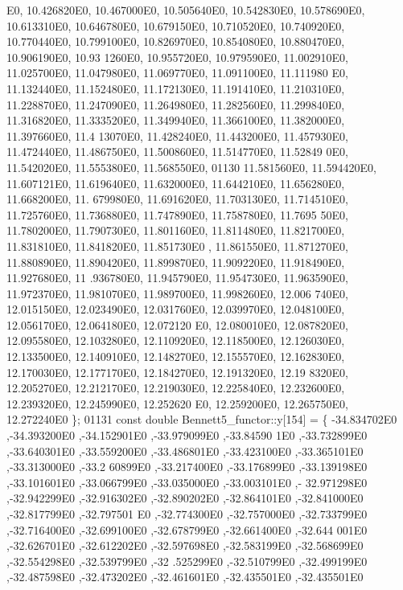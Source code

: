 \begin{DoxyCode}
      E0, 10.426820E0, 10.467000E0, 10.505640E0, 10.542830E0, 10.578690E0, 10.613310E0, 10.646780E0, 10.679150E0, 
      10.710520E0, 10.740920E0, 10.770440E0, 10.799100E0, 10.826970E0, 10.854080E0, 10.880470E0, 10.906190E0, 10.93
      1260E0, 10.955720E0, 10.979590E0, 11.002910E0, 11.025700E0, 11.047980E0, 11.069770E0, 11.091100E0, 11.111980
      E0, 11.132440E0, 11.152480E0, 11.172130E0, 11.191410E0, 11.210310E0, 11.228870E0, 11.247090E0, 11.264980E0, 
      11.282560E0, 11.299840E0, 11.316820E0, 11.333520E0, 11.349940E0, 11.366100E0, 11.382000E0, 11.397660E0, 11.4
      13070E0, 11.428240E0, 11.443200E0, 11.457930E0, 11.472440E0, 11.486750E0, 11.500860E0, 11.514770E0, 11.52849
      0E0, 11.542020E0, 11.555380E0, 11.568550E0,
01130 11.581560E0, 11.594420E0, 11.607121E0, 11.619640E0, 11.632000E0, 11.644210E0, 11.656280E0, 11.668200E0, 11.
      679980E0, 11.691620E0, 11.703130E0, 11.714510E0, 11.725760E0, 11.736880E0, 11.747890E0, 11.758780E0, 11.7695
      50E0, 11.780200E0, 11.790730E0, 11.801160E0, 11.811480E0, 11.821700E0, 11.831810E0, 11.841820E0, 11.851730E0
      , 11.861550E0, 11.871270E0, 11.880890E0, 11.890420E0, 11.899870E0, 11.909220E0, 11.918490E0, 11.927680E0, 11
      .936780E0, 11.945790E0, 11.954730E0, 11.963590E0, 11.972370E0, 11.981070E0, 11.989700E0, 11.998260E0, 12.006
      740E0, 12.015150E0, 12.023490E0, 12.031760E0, 12.039970E0, 12.048100E0, 12.056170E0, 12.064180E0, 12.072120
      E0, 12.080010E0, 12.087820E0, 12.095580E0, 12.103280E0, 12.110920E0, 12.118500E0, 12.126030E0, 12.133500E0, 
      12.140910E0, 12.148270E0, 12.155570E0, 12.162830E0, 12.170030E0, 12.177170E0, 12.184270E0, 12.191320E0, 12.19
      8320E0, 12.205270E0, 12.212170E0, 12.219030E0, 12.225840E0, 12.232600E0, 12.239320E0, 12.245990E0, 12.252620
      E0, 12.259200E0, 12.265750E0, 12.272240E0 \};
01131 \textcolor{keyword}{const} \textcolor{keywordtype}{double} Bennett5\_functor::y[154] = \{ -34.834702E0 ,-34.393200E0 ,-34.152901E0 ,-33.979099E0 ,-33.84590
      1E0 ,-33.732899E0 ,-33.640301E0 ,-33.559200E0 ,-33.486801E0 ,-33.423100E0 ,-33.365101E0 ,-33.313000E0 ,-33.2
      60899E0 ,-33.217400E0 ,-33.176899E0 ,-33.139198E0 ,-33.101601E0 ,-33.066799E0 ,-33.035000E0 ,-33.003101E0 ,-
      32.971298E0 ,-32.942299E0 ,-32.916302E0 ,-32.890202E0 ,-32.864101E0 ,-32.841000E0 ,-32.817799E0 ,-32.797501
      E0 ,-32.774300E0 ,-32.757000E0 ,-32.733799E0 ,-32.716400E0 ,-32.699100E0 ,-32.678799E0 ,-32.661400E0 ,-32.644
      001E0 ,-32.626701E0 ,-32.612202E0 ,-32.597698E0 ,-32.583199E0 ,-32.568699E0 ,-32.554298E0 ,-32.539799E0 ,-32
      .525299E0 ,-32.510799E0 ,-32.499199E0 ,-32.487598E0 ,-32.473202E0 ,-32.461601E0 ,-32.435501E0 ,-32.435501E0 

\end{DoxyCode}
